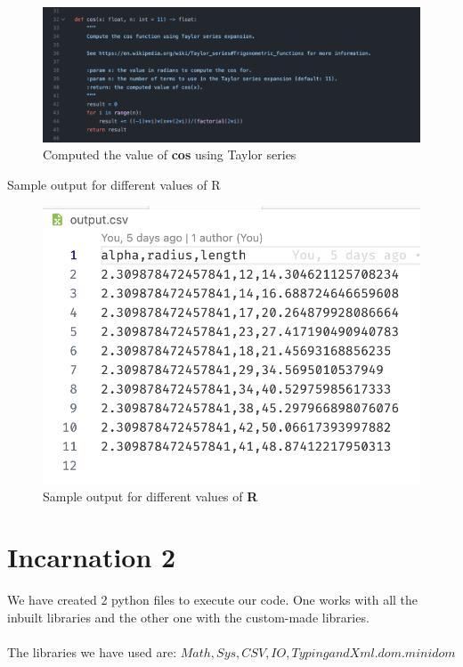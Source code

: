 \begin{figure}[h]
    \centering
    \includegraphics[width=13cm]{images/cos.png}
    \caption{Computed the value of \textbf{cos} using Taylor series}
    \label{fig:cos}
\end{figure}
\newpage
\noindent\large Sample output for different values of R

\begin{figure}[h]
    \centering
    \includegraphics[width=12cm]{images/_CSV.png}
    \caption{Sample output for different values of \textbf{R}}
    \label{fig:csv}
\end{figure}




\section{Incarnation 2}

We have created 2 python files to execute our code. One works with all the inbuilt libraries and the other one with the custom-made libraries.
\\
\\
The libraries we have used are: $Math, Sys, CSV ,IO , Typing and Xml.dom.minidom$

